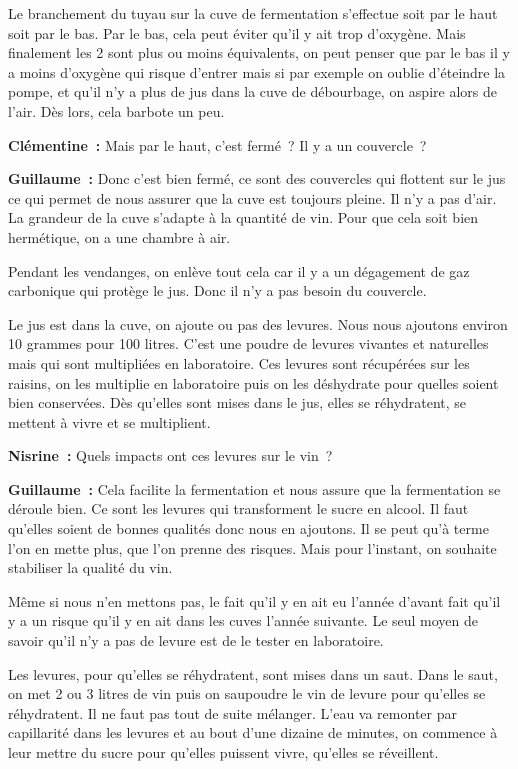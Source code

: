 \documentclass[a4paper, titlepage]{report}
\begin{document}
Le branchement du tuyau sur la cuve de fermentation s'effectue soit par
le haut soit par le bas. Par le bas, cela peut éviter qu'il y ait trop
d'oxygène. Mais finalement les 2 sont plus ou moins équivalents, on peut
penser que par le bas il y a moins d'oxygène qui risque d'entrer mais si
par exemple on oublie d'éteindre la pompe, et qu'il n'y a plus de jus
dans la cuve de débourbage, on aspire alors de l'air. Dès lors, cela
barbote un peu.

\textbf{Clémentine~:} Mais par le haut, c'est fermé~? Il y a un
couvercle~?

\textbf{Guillaume~:} Donc c'est bien fermé, ce sont des couvercles qui
flottent sur le jus ce qui permet de nous assurer que la cuve est
toujours pleine. Il n'y a pas d'air. La grandeur de la cuve s'adapte à
la quantité de vin. Pour que cela soit bien hermétique, on a une chambre
à air.

Pendant les vendanges, on enlève tout cela car il y a un dégagement de
gaz carbonique qui protège le jus. Donc il n'y a pas besoin du
couvercle.

Le jus est dans la cuve, on ajoute ou pas des levures. Nous nous
ajoutons environ 10 grammes pour 100 litres. C'est une poudre de levures
vivantes et naturelles mais qui sont multipliées en laboratoire. Ces
levures sont récupérées sur les raisins, on les multiplie en laboratoire
puis on les déshydrate pour quelles soient bien conservées. Dès qu'elles
sont mises dans le jus, elles se réhydratent, se mettent à vivre et se
multiplient.

\textbf{Nisrine~:} Quels impacts ont ces levures sur le vin~?

\textbf{Guillaume~:} Cela facilite la fermentation et nous assure que la
fermentation se déroule bien. Ce sont les levures qui transforment le
sucre en alcool. Il faut qu'elles soient de bonnes qualités donc nous en
ajoutons. Il se peut qu'à terme l'on en mette plus, que l'on prenne des
risques. Mais pour l'instant, on souhaite stabiliser la qualité du vin.

Même si nous n'en mettons pas, le fait qu'il y en ait eu l'année d'avant
fait qu'il y a un risque qu'il y en ait dans les cuves l'année suivante.
Le seul moyen de savoir qu'il n'y a pas de levure est de le tester en
laboratoire.

Les levures, pour qu'elles se réhydratent, sont mises dans un saut. Dans
le saut, on met 2 ou 3 litres de vin puis on saupoudre le vin de levure
pour qu'elles se réhydratent. Il ne faut pas tout de suite mélanger.
L'eau va remonter par capillarité dans les levures et au bout d'une
dizaine de minutes, on commence à leur mettre du sucre pour qu'elles
puissent vivre, qu'elles se réveillent.
\end{document}
